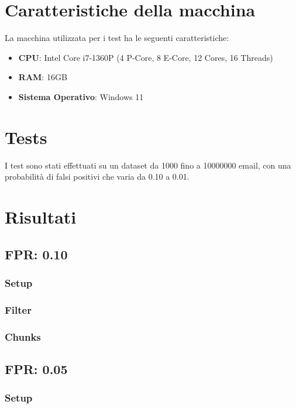 \documentclass[11pt]{article}
\begin{document}
    \section{Caratteristiche della macchina}\label{sec:caratteristiche-della-macchina}
    La macchina utilizzata per i test ha le seguenti caratteristiche:
    \begin{itemize}
        \item \textbf{CPU}: Intel Core i7-1360P (4 P-Core, 8 E-Core, 12 Cores, 16 Threads)
        \item \textbf{RAM}: 16GB
        \item \textbf{Sistema Operativo}: Windows 11
    \end{itemize}

    \section{Tests}\label{sec:tests}
    I test sono stati effettuati su un dataset da 1000 fino a 10000000 email, con una probabilità di falsi positivi che
    varia da 0.10 a 0.01.

    \section{Risultati}\label{sec:risultati}
    \subsection{FPR: 0.10}\label{subsec:fpr-010}
    \subsubsection{Setup}\label{subsubsec:fpr-010-setup}
    \subsubsection{Filter}\label{subsubsec:fpr-010-filter}
    \subsubsection{Chunks}\label{subsubsec:fpr-010-chunks}

    \subsection{FPR: 0.05}\label{subsec:fpr-005}
    \subsubsection{Setup}\label{subsubsec:fpr-005-setup}
\end{document}
